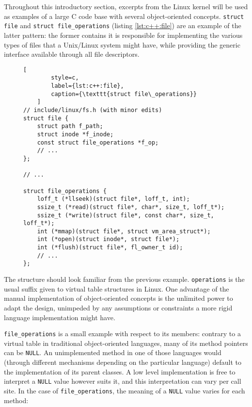 Throughout this introductory section, excerpts from the Linux kernel will be
used as examples of a large C code base with several object-oriented
concepts\footnotemark.  \texttt{struct file} and \texttt{struct
file\_operations} (listing \ref{lst:c++:file}) are an example of the latter
pattern: the former contains it is responsible for implementing the various
types of files that a Unix/Linux system might have, while providing the generic
interface available through all file descriptors.


\begin{figure}[ht]
    \begin{lstlisting}[
        style=c,
        label={lst:c++:file},
        caption={\texttt{struct file\_operations}}
    ]
// include/linux/fs.h (with minor edits)
struct file {
    struct path f_path;
    struct inode *f_inode;
    const struct file_operations *f_op;
    // ...
};

// ...

struct file_operations {
    loff_t (*llseek)(struct file*, loff_t, int);
    ssize_t (*read)(struct file*, char*, size_t, loff_t*);
    ssize_t (*write)(struct file*, const char*, size_t, loff_t*);
    int (*mmap)(struct file*, struct vm_area_struct*);
    int (*open)(struct inode*, struct file*);
    int (*flush)(struct file*, fl_owner_t id);
    // ...
};
    \end{lstlisting}
\end{figure}

The structure should look familiar from the previous example.
\texttt{operations} is the usual suffix given to virtual table structures in
Linux.  One advantage of the manual implementation of object-oriented concepts
is the unlimited power to adapt the design, unimpeded by any assumptions or
constraints a more rigid language implementation might have.

\texttt{file\_operations} is a small example with respect to its members:
contrary to a virtual table in traditional object-oriented languages, many of
its method pointers can be \texttt{NULL}.  An unimplemented method in one of
those languages would (through different mechanisms depending on the particular
language) default to the implementation of its parent classes.  A low level
implementation is free to interpret a \texttt{NULL} value however suits it, and
this interpretation can vary per call site.  In the case of
\texttt{file\_operations}, the meaning of a \texttt{NULL} value varies for each
method:

